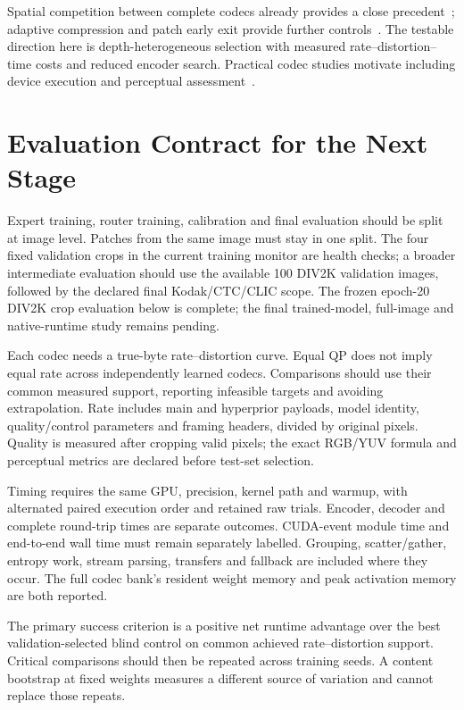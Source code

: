Spatial competition between complete codecs already provides a close
precedent~\cite{blard2026spatial}; adaptive compression and patch early exit
provide further controls~\cite{tao2023adanic,hu2023cgslim,wang2022ape}.
The testable direction here is depth-heterogeneous selection with measured
rate--distortion--time costs and reduced encoder search. Practical codec
studies motivate including device execution and perceptual
assessment~\cite{jia2025dcvcrt,tatwawadi2026practical}.

\section{Evaluation Contract for the Next Stage}

Expert training, router training, calibration and final evaluation should be
split at image level. Patches from the same image must stay in one split.
The four fixed validation crops in the current training monitor are health
checks; a broader intermediate evaluation should use the available 100
DIV2K validation images, followed by the declared final Kodak/CTC/CLIC
scope. The frozen epoch-20 DIV2K crop evaluation below is complete;
the final trained-model, full-image and native-runtime study remains pending.

Each codec needs a true-byte rate--distortion curve. Equal QP does not imply
equal rate across independently learned codecs. Comparisons should use their
common measured support, reporting infeasible targets and avoiding
extrapolation. Rate includes main and hyperprior payloads, model identity,
quality/control parameters and framing headers, divided by original pixels.
Quality is measured after cropping valid pixels; the exact RGB/YUV formula
and perceptual metrics are declared before test-set selection.

Timing requires the same GPU, precision, kernel path and warmup, with
alternated paired execution order and retained raw trials. Encoder,
decoder and complete round-trip times are separate outcomes. CUDA-event
module time and end-to-end wall time must remain separately labelled.
Grouping, scatter/gather, entropy work, stream parsing, transfers and fallback
are included where they occur. The full codec bank's resident weight memory
and peak activation memory are both reported.

The primary success criterion is a positive net runtime advantage over the
best validation-selected blind control on common achieved rate--distortion
support. Critical comparisons should then be repeated across training
seeds. A content bootstrap at fixed weights measures a different source of
variation and cannot replace those repeats.


